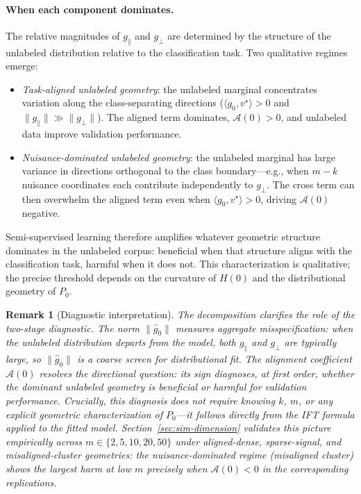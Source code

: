 \documentclass[11pt]{article}
\newtheorem{remark}{Remark}
\theoremstyle{definition}
\newcommand{\calA}{\mathcal{A}}
\begin{document}
\paragraph{When each component dominates.}
The relative magnitudes of \(g_\parallel\) and \(g_\perp\) are
determined by the structure of the unlabeled distribution relative to
the classification task.
Two qualitative regimes emerge:
\begin{itemize}[leftmargin=1.5em,itemsep=2pt]
\item \emph{Task-aligned unlabeled geometry}:
      the unlabeled marginal concentrates variation along the
      class-separating directions
      (\(\langle g_0, v^\star\rangle > 0\) and \(\|g_\parallel\| \gg \|g_\perp\|\)).
      The aligned term dominates, \(\calA(0)>0\), and unlabeled data
      improve validation performance.
\item \emph{Nuisance-dominated unlabeled geometry}:
      the unlabeled marginal has large variance in directions orthogonal
      to the class boundary---e.g., when \(m-k\) nuisance coordinates
      each contribute independently to \(g_\perp\).
      The cross term can then overwhelm the aligned term even when
      \(\langle g_0, v^\star\rangle > 0\), driving \(\calA(0)\) negative.
\end{itemize}
Semi-supervised learning therefore amplifies whatever geometric structure
dominates in the unlabeled corpus: beneficial when that structure aligns
with the classification task, harmful when it does not.
This characterization is qualitative; the precise threshold depends on the
curvature of \(H(0)\) and the distributional geometry of \(P_0\).

\begin{remark}[Diagnostic interpretation]
The decomposition clarifies the role of the two-stage diagnostic.
The norm \(\|\hat g_0\|\) measures aggregate misspecification: when
the unlabeled distribution departs from the model, both \(g_\parallel\)
and \(g_\perp\) are typically large, so \(\|\hat g_0\|\) is a coarse
screen for distributional fit.
The alignment coefficient \(\calA(0)\) resolves the directional question:
its sign diagnoses, at first order, whether the dominant unlabeled
geometry is beneficial or harmful for validation performance.
Crucially, this diagnosis does not require knowing \(k\), \(m\), or
any explicit geometric characterization of \(P_0\)---it follows directly
from the IFT formula applied to the fitted model.
Section~\ref{sec:sim-dimension} validates this picture empirically across
\(m\in\{2,5,10,20,50\}\) under aligned-dense, sparse-signal, and
misaligned-cluster geometries: the nuisance-dominated regime (misaligned
cluster) shows the largest harm at low \(m\) precisely when
\(\calA(0) < 0\) in the corresponding replications.
\end{remark}
\end{document}
